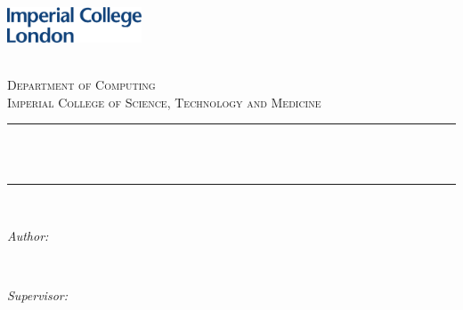 \begin{titlepage}

\newcommand{\HRule}{\rule{\linewidth}{0.5mm}} %


\includegraphics[width = 4cm]{./figures/imperial}\\[0.5cm] 

\center %
 

\textsc{\LARGE \reporttype}\\[1.5cm] 
\textsc{\Large Department of Computing}\\[0.5cm] 
\textsc{\large Imperial College of Science, Technology and Medicine}\\[0.5cm] 


\HRule \\[0.4cm]
{ \huge \bfseries \reporttitle}\\ %
\HRule \\[1.5cm]
 

\begin{minipage}{0.4\textwidth}
\begin{flushleft} \large
\emph{Author:}\\
\reportauthor %
\end{flushleft}
\end{minipage}
~
\begin{minipage}{0.4\textwidth}
\begin{flushright} \large
\emph{Supervisor:} \\
\supervisor %
\end{flushright}
\end{minipage}\\[4cm]





\end{titlepage}
